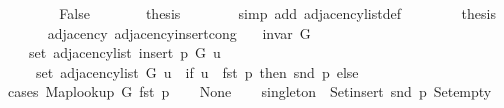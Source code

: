 \begin{isabellebody}
\ \ \isamarkupfalse%
\isanewline
\ \ \ \ \isamarkupfalse%
\ False\isanewline
\ \ \ \ \isamarkupfalse%
\ \isamarkupfalse%
\ {\isacharquery}{\kern0pt}thesis\isanewline
\ \ \ \ \ \ \isamarkupfalse%
\ {\isacharparenleft}{\kern0pt}simp\ add{\isacharcolon}{\kern0pt}\ adjacency{\isacharunderscore}{\kern0pt}list{\isacharunderscore}{\kern0pt}def{\isacharparenright}{\kern0pt}\isanewline
\ \ \isamarkupfalse%
\isanewline
\ \ \isamarkupfalse%
\ \isamarkupfalse%
\ {\isacharquery}{\kern0pt}thesis\isanewline
\ \ \ \ \isacommand{{\isachardot}{\kern0pt}}\isamarkupfalse%
\isanewline
{}\isamarkupfalse%
%
\endisatagproof
{\isafoldproof}%
%
\isadelimproof
\isanewline
%
\endisadelimproof
\isanewline
{}\isamarkupfalse%
\ {\isacharparenleft}{\kern0pt}\ adjacency{\isacharparenright}{\kern0pt}\ adjacency{\isacharunderscore}{\kern0pt}insert{\isacharunderscore}{\kern0pt}cong{\isacharcolon}{\kern0pt}\isanewline
\ \ \ {\isachardoublequoteopen}invar\ G{\isachardoublequoteclose}\isanewline
\ \ \isanewline
\ \ \ \ {\isachardoublequoteopen}set\ {\isacharparenleft}{\kern0pt}adjacency{\isacharunderscore}{\kern0pt}list\ {\isacharparenleft}{\kern0pt}insert\ p\ G{\isacharparenright}{\kern0pt}\ u{\isacharparenright}{\kern0pt}\ {\isacharequal}{\kern0pt}\isanewline
\ \ \ \ \ set\ {\isacharparenleft}{\kern0pt}adjacency{\isacharunderscore}{\kern0pt}list\ G\ u{\isacharparenright}{\kern0pt}\ {\isasymunion}\ {\isacharparenleft}{\kern0pt}if\ u\ {\isacharequal}{\kern0pt}\ fst\ p\ then\ {\isacharbraceleft}{\kern0pt}snd\ p{\isacharbraceright}{\kern0pt}\ else\ {\isacharbraceleft}{\kern0pt}{\isacharbraceright}{\kern0pt}{\isacharparenright}{\kern0pt}{\isachardoublequoteclose}\isanewline
%
\isadelimproof
%
\endisadelimproof
%
\isatagproof
{}\isamarkupfalse%
\ {\isacharparenleft}{\kern0pt}cases\ {\isachardoublequoteopen}Map{\isacharunderscore}{\kern0pt}lookup\ G\ {\isacharparenleft}{\kern0pt}fst\ p{\isacharparenright}{\kern0pt}{\isachardoublequoteclose}{\isacharparenright}{\kern0pt}\isanewline
\ \ \isamarkupfalse%
\ None\isanewline
\ \ \isamarkupfalse%
\ {\isacharquery}{\kern0pt}singleton\ {\isacharequal}{\kern0pt}\ {\isachardoublequoteopen}Set{\isacharunderscore}{\kern0pt}insert\ {\isacharparenleft}{\kern0pt}snd\ p{\isacharparenright}{\kern0pt}\ Set{\isacharunderscore}{\kern0pt}empty{\isachardoublequoteclose}\isanewline
\ \ \isacommand{{\isacharbraceleft}{\kern0pt}}\isamarkupfalse%

\end{isabellebody}
